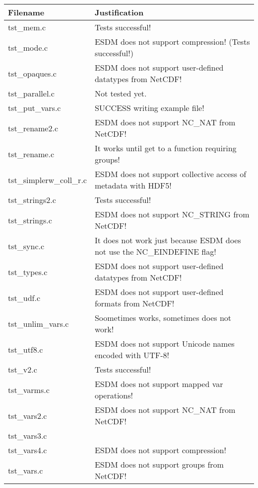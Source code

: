 \clearpage

\begin{table}[H]
\centering
\begin{tabular}{|l|l|}
\hline
Filename & Justification \\ \hline \hline
tst\_mem.c   &    Tests successful!   \\ \hline
tst\_mode.c   &   ESDM does not support compression! (Tests successful!)    \\ \hline
tst\_opaques.c   &  ESDM does not support user-defined datatypes from NetCDF!     \\ \hline
tst\_parallel.c   &   Not tested yet.    \\ \hline
tst\_put\_vars.c   &   SUCCESS writing example file!    \\ \hline
tst\_rename2.c   &  ESDM does not support NC\_NAT from NetCDF!     \\ \hline
tst\_rename.c   &   It works until get to a function requiring groups!  \\ \hline
tst\_simplerw\_coll\_r.c   &   ESDM does not support collective access of metadata with HDF5!  \\ \hline
tst\_strings2.c   &   Tests successful!    \\ \hline
tst\_strings.c   &  ESDM does not support NC\_STRING from NetCDF!     \\ \hline
tst\_sync.c   &  It does not work just because ESDM does not use the NC\_EINDEFINE flag!  \\ \hline
tst\_types.c   &  ESDM does not support user-defined datatypes from NetCDF!     \\ \hline
tst\_udf.c   &   ESDM does not support user-defined formats from NetCDF!   \\ \hline
tst\_unlim\_vars.c   &   Soometimes works, sometimes does not work!    \\ \hline
tst\_utf8.c   &   ESDM does not support Unicode names encoded with UTF-8!  \\ \hline
tst\_v2.c   &    Tests successful!   \\ \hline
tst\_varms.c   &   ESDM does not support mapped var operations!  \\ \hline
tst\_vars2.c   &  ESDM does not support NC\_NAT from NetCDF!  \\ \hline
tst\_vars3.c   &       \\ \hline
tst\_vars4.c   &  ESDM does not support compression!     \\ \hline
tst\_vars.c   &    ESDM does not support groups from NetCDF!   \\ \hline

\end{tabular}
\end{table}
